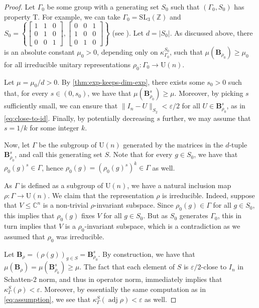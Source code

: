\documentclass[11pt]{article}
\newcommand{\C}{{\mathbb C}}
\newcommand{\Z}{{\mathbb Z}}
\theoremstyle{plain}
\numberwithin{equation}{section}
\theoremstyle{definition}
\DeclareMathOperator\adj{adj}
\newcommand{\SL}{\mathrm{SL}}
\newcommand{\norm}[1]{\lVert#1\rVert}
\newcommand{\ab}[1]{\left\lvert#1\right\rvert}
\newcommand{\U}{\mathrm{U}}
\newcommand{\tuple}[1]{\mathbf{#1}}
\newcommand{\vB}{\tuple{B}}
\newcommand\smat[1]{\left[\begin{smallmatrix}#1\end{smallmatrix}\right]}
\begin{document}
\begin{proof}
    Let $\Gamma_0$ be some group with a generating set $S_0$ such that $(\Gamma_0,S_0)$ has property T. For example, we can take $\Gamma_0=\SL_3(\Z)$ and $S_0=\left\{ \smat{1&1&0\\0&1&0\\0&0&1}, \smat{0&0&1\\1&0&0\\0&1&0}\right\}$ (see \cite[Example 3.I]{LUBOTZKY2008730}). Let $d=\ab {S_0}$. As discussed above, there is an absolute constant $\mu_0>0$, depending only on $\kappa_{\Gamma_0}^{S_0}$, such that $\mu(\vB_{\rho_0})\geq \mu_0$ for all irreducible unitary representations ${\rho_0}:\Gamma_0 \to \U(n)$. 

    Let $\mu=\mu_0/d >0$. By \cref{thm:exp-keeps-dim-exp}, there exists some $s_0>0$ such that, for every $s \in (0,s_0)$, we have that $\mu(\vB_{\rho_0}^s)\geq\mu$. Moreover, by picking $s$ sufficiently small, we can ensure that $\norm{I_n-U}_{S_2}<\varepsilon/2$ for all $U \in \vB_{\rho_0}^s$, as in \eqref{eq:close-to-id}. Finally, by potentially decreasing $s$ further, we may assume that $s=1/k$ for some integer $k$.

    Now, let $\Gamma$ be the subgroup of $\U(n)$ generated by the matrices in the $d$-tuple $\vB_{\rho_0}^s$, and call this generating set $S$. 
    Note that for every $g \in S_0$, we have that $\rho_0(g)^s \in \Gamma$, hence $\rho_0(g) = (\rho_0(g)^s)^k \in \Gamma$ as well. 

    As $\Gamma$ is defined as a subgroup of $\U(n)$, we have a natural inclusion map $\rho:\Gamma \to \U(n)$. 
    We claim that the representation $\rho$ is irreducible. Indeed, suppose that $V \leq \C^n$ is a non-trivial $\rho$-invariant subspace. Since $\rho_0(g) \in \Gamma$ for all $g \in S_0$, this implies that $\rho_0(g)$ fixes $V$ for all $g \in S_0$. But as $S_0$ generates $\Gamma_0$, this in turn implies that $V$ is a $\rho_0$-invariant subspace, which is a contradiction as we assumed that $\rho_0$ was irreducible.

    Let $\vB_\rho=(\rho(g))_{g\in S}=\vB_{\rho_0}^s$.
    By construction, we have that $\mu(\vB_\rho)=\mu(\vB_{\rho_0}^s)\geq \mu$. The fact that each element of $S$ is $\varepsilon/2$-close to $I_n$ in Schatten-$2$ norm, and thus in operator norm, immediately implies that $\kappa_\Gamma^S(\rho)<\varepsilon$. Moreover, by essentially the same computation as in \eqref{eq:assumption}, we see that $\kappa_\Gamma^S(\adj \rho)<\varepsilon$ as well.
\end{proof}
\end{document}
